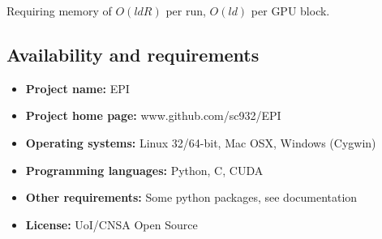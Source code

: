 \documentclass[index]{subfiles}
\begin{document}
Requiring memory of $O(ldR)$ per run, $O(ld)$ per GPU block.




\subsection{Availability and requirements}
 \begin{itemize}
  \item \textbf{Project name:} EPI
  \item \textbf{Project home page:} www.github.com/sc932/EPI
  \item \textbf{Operating systems:} Linux 32/64-bit, Mac OSX, Windows (Cygwin)
  \item \textbf{Programming languages:} Python, C, CUDA
  \item \textbf{Other requirements:} Some python packages, see documentation
  \item \textbf{License:} UoI/CNSA Open Source
 \end{itemize}



\end{document}
